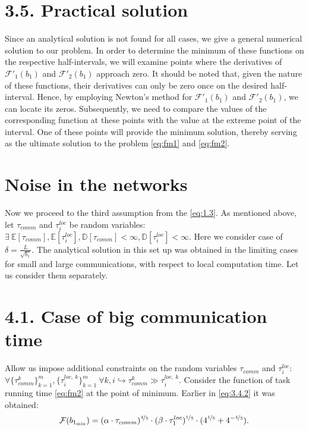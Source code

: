 \documentclass{article}
\theoremstyle{definition}
\theoremstyle{plain}
\begin{document}
\section*{3.5. Practical solution}\label{eq:3.5}
Since an analytical solution is not found for all cases, we give a general numerical solution to our problem. In order to determine the minimum of these functions on the respective half-intervals, we will examine points where the derivatives of $\mathcal{F'}_1(b_1)$ and $\mathcal{F'}_2(b_1)$ approach zero. It should be noted that, given the nature of these functions, their derivatives can only be zero once on the desired half-interval. Hence, by employing Newton's method \cite{polyak2007newton} for $\mathcal{F'}_1(b_1)$ and $\mathcal{F'}_2(b_1)$, we can locate its zeros. Subsequently, we need to compare the values of the corresponding function at these points with the value at the extreme point of the interval. One of these points will provide the minimum solution, thereby serving as the ultimate solution to the problem \eqref{eq:fm1} and \eqref{eq:fm2}.

\section{Noise in the networks}

Now we proceed to the third assumption from the \ref{eq:1.3}. As mentioned above, let $\tau_{comm}$ and $\tau_i^{loc}$ be random variables: $\exists ~\mathbb E [\tau_{comm}], \mathbb E [\tau_i^{loc}], \mathbb D [\tau_{comm}] < \infty, \mathbb D [\tau_i^{loc}] < \infty$. Here we consider case of $\delta = \frac{L}{\sqrt{b_1}}$. The analytical solution in this set up was obtained in the limiting cases for small and large communications, with respect to local computation time. Let us consider them separately. 

\section*{4.1. Case of big communication time}\label{s:4.1}

Allow us impose additional constraints on the random variables $\tau_{comm}$ and $\tau_i^{loc}$: $\forall \{\tau_{comm}^k\}_{k = 1}^m, \{\tau_{i}^{loc, ~k}\}_{k = 1}^m~\forall k, i \hookrightarrow \tau_{comm}^k \gg \tau_{i}^{loc, ~k}$. Consider the function of task running time \eqref{eq:fm2} at the point of minimum. Earlier in \ref{eq:3.4.2} it was obtained:
\begin{equation}
    \label{eq:17}
    \mathcal{F}(b_{1_{\min}}) = (\alpha\cdot\tau_{comm})^{\nicefrac{4}{5}}\cdot (\beta\cdot\tau_1^{loc})^{\nicefrac{1}{5}}\cdot(4^{\nicefrac{1}{5}} + 4^{-\nicefrac{4}{5}}).
\end{equation}
\end{document}
